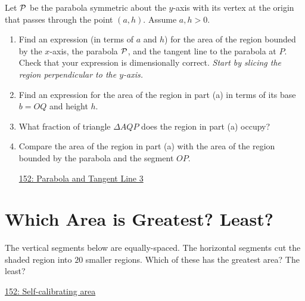 \documentclass{ximera}
\begin{document}
\begin{question} \label{Q88w4448ewe}
Let ${\cal P}$ be the parabola symmetric about the $y$-axis with its vertex at the origin that passes through the point $(a,h)$. Assume $a,h>0$.

\begin{enumerate}

\item Find an expression (in terms of $a$ and $h$) for the area of the region bounded by the $x$-axis, the parabola ${\cal P}$, and the tangent line to the parabola at $P$. Check that your expression is dimensionally correct. \emph{Start by slicing the region perpendicular to the $y$-axis.}

\item Find an expression for the area of the region in part (a) in terms of its base $b=OQ$ and height $h$.

\item What fraction of triangle $\Delta AQP$ does the region in part (a) occupy?

\item Compare the area of the region in part (a) with the area of the region bounded by the parabola and the segment $OP$.

\begin{onlineOnly}
    \begin{center}
\end{center}
\end{onlineOnly}

\href{https://www.desmos.com/calculator/avl2r9dubt}{152: Parabola and Tangent Line 3}

\end{enumerate}
\end{question}


\section{Which Area is Greatest? Least?}

\begin{question} \label{QPlerredd}

The vertical segments below are equally-spaced. The horizontal segments cut the shaded region into $20$ smaller regions. Which of these has the greatest area? The least?

\begin{onlineOnly}
    \begin{center}
\end{center}
\end{onlineOnly}

\href{https://www.desmos.com/calculator/wsgteg55ta}{152: Self-calibrating area}
\end{question}
\end{document}
